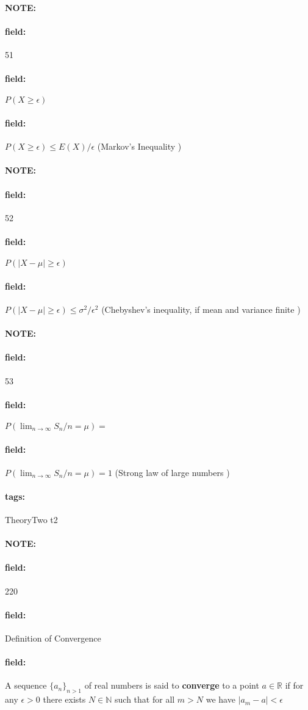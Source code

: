 \documentclass[12pt]{article}
\newenvironment{note}{\paragraph{NOTE:}}{}
\newenvironment{field}{\paragraph{field:}}{}
\newcommand*{\tags}[1]{\paragraph{tags: }#1}
\begin{document}
\begin{note}
  \begin{field}
    \tiny 51
  \end{field}
  \begin{field}
    $P(X \geq \epsilon)$
  \end{field}
  \begin{field}
    $P(X \geq \epsilon) \leq E(X) / \epsilon$ (Markov's Inequality )
  \end{field}
\end{note}

\begin{note}
  \begin{field}
    \tiny 52
  \end{field}
  \begin{field}
    $P(|X-\mu| \geq \epsilon)$
  \end{field}
  \begin{field}
    $P(|X-\mu| \geq \epsilon) \leq \sigma^2/\epsilon^2$ (Chebyshev's inequality, if mean and variance finite )
  \end{field}
\end{note}

\begin{note}
  \begin{field}
    \tiny 53
  \end{field}
  \begin{field}
    $P(\lim_{n\to \infty} S_n/n = \mu) = $
  \end{field}
  \begin{field}
  $P(\lim_{n\to \infty} S_n/n = \mu) = 1$ (Strong law of large numbers )
\end{field}
\end{note}

\tags{TheoryTwo t2}

\begin{note} \begin{field} \tiny 220 \end{field}
  \begin{field}
    Definition of Convergence
  \end{field}
  \begin{field}
    A sequence $\{a_n\}_{n > 1}$ of real numbers is said to \textbf{converge} to a point $a \in \mathbb{R}$ if for any $\epsilon > 0$ there exists $N \in \mathbb{N}$ such that for all $m > N $ we have $|a_m - a| < \epsilon $
  \end{field}
\end{note}
\end{document}

